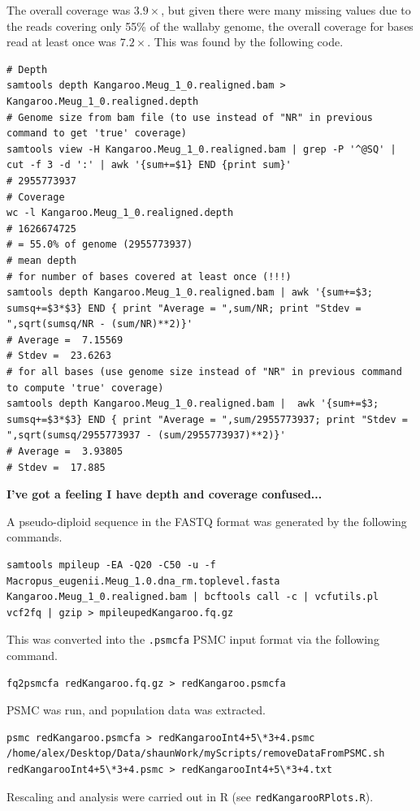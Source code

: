 \documentclass[11pt,a4paper]{article}
\begin{document}
The overall coverage was $3.9\times$, but given there were many missing values due to the reads covering only 55\% of the wallaby genome, the overall coverage for bases read at least once was $7.2\times$. This was found by the following code.
\begin{lstlisting}
# Depth
samtools depth Kangaroo.Meug_1_0.realigned.bam > Kangaroo.Meug_1_0.realigned.depth
# Genome size from bam file (to use instead of "NR" in previous command to get 'true' coverage)
samtools view -H Kangaroo.Meug_1_0.realigned.bam | grep -P '^@SQ' | cut -f 3 -d ':' | awk '{sum+=$1} END {print sum}'
# 2955773937
# Coverage
wc -l Kangaroo.Meug_1_0.realigned.depth
# 1626674725
# = 55.0% of genome (2955773937)
# mean depth
# for number of bases covered at least once (!!!)
samtools depth Kangaroo.Meug_1_0.realigned.bam | awk '{sum+=$3; sumsq+=$3*$3} END { print "Average = ",sum/NR; print "Stdev = ",sqrt(sumsq/NR - (sum/NR)**2)}'
# Average =  7.15569
# Stdev =  23.6263
# for all bases (use genome size instead of "NR" in previous command to compute 'true' coverage)
samtools depth Kangaroo.Meug_1_0.realigned.bam |  awk '{sum+=$3; sumsq+=$3*$3} END { print "Average = ",sum/2955773937; print "Stdev = ",sqrt(sumsq/2955773937 - (sum/2955773937)**2)}'
# Average =  3.93805
# Stdev =  17.885
\end{lstlisting}
\textbf{I've got a feeling I have depth and coverage confused...}


A pseudo-diploid sequence in the FASTQ format was generated by the following commands.
\begin{lstlisting}
samtools mpileup -EA -Q20 -C50 -u -f Macropus_eugenii.Meug_1.0.dna_rm.toplevel.fasta Kangaroo.Meug_1_0.realigned.bam | bcftools call -c | vcfutils.pl vcf2fq | gzip > mpileupedKangaroo.fq.gz
\end{lstlisting}

This was converted into the \verb|.psmcfa| PSMC input format via the following command.
\begin{lstlisting}
fq2psmcfa redKangaroo.fq.gz > redKangaroo.psmcfa
\end{lstlisting}
PSMC was run, and population data was extracted.
\begin{lstlisting}
psmc redKangaroo.psmcfa > redKangarooInt4+5\*3+4.psmc
/home/alex/Desktop/Data/shaunWork/myScripts/removeDataFromPSMC.sh redKangarooInt4+5\*3+4.psmc > redKangarooInt4+5\*3+4.txt
\end{lstlisting}
Rescaling and analysis were carried out in R (see \verb|redKangarooRPlots.R|).
\end{document}
